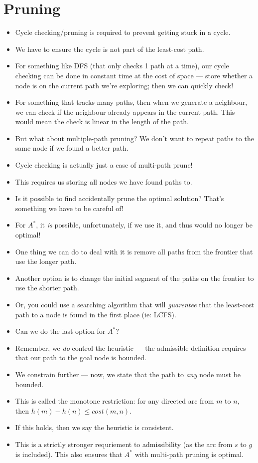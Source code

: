 \documentclass{article}
\begin{document}
\section{Pruning}
\begin{itemize}
    \item Cycle checking/pruning is required to prevent getting stuck in a cycle.
    \item We have to ensure the cycle is not part of the least-cost path.
    \item For something like DFS (that only checks 1 path at a time), our cycle checking can be done in constant time at the cost of space --- store whether a node is on the current path we're exploring; then we can quickly check!
    \item For something that tracks many paths, then when we generate a neighbour, we can check if the neighbour already appears in the current path.  This would mean the check is linear in the length of the path.
    \item But what about multiple-path pruning?  We don't want to repeat paths to the same node if we found a better path.
    \item Cycle checking is actually just a case of multi-path prune!
    \item This requires us storing all nodes we have found paths to.
    \item Is it possible to find accidentally prune the optimal solution?  That's something we have to be careful of!
    \item For $A^*$, it \emph{is} possible, unfortunately, if we use it, and thus would no longer be optimal!
    \item One thing we can do to deal with it is remove all paths from the frontier that use the longer path.
    \item Another option is to change the initial segment of the paths on the frontier to use the shorter path.
    \item Or, you could use a searching algorithm that will \emph{guarentee} that the least-cost path to a node is found in the first place (ie: LCFS).
    \item Can we do the last option for $A^*$?
    \item Remember, we \emph{do} control the heuristic --- the admissible definition requires that our path to the goal node is bounded.
    \item We constrain further --- now, we state that the path to \emph{any} node must be bounded.
    \item This is called the monotone restriction: for any directed arc from $m$ to $n$, then $h(m) - h(n) \leq cost(m, n)$.
    \item If this holds, then we say the heuristic is consistent.
    \item This is a strictly stronger requriement to admissibility (as the arc from $s$ to $g$ is included).  This also ensures that $A^*$ with multi-path pruning is optimal.
\end{itemize}
\end{document}
